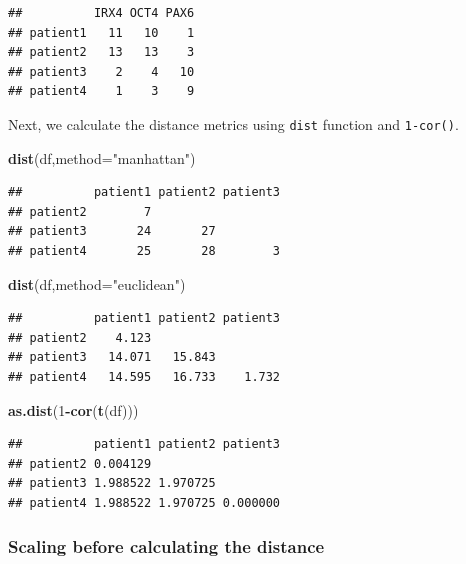 \documentclass[12pt,]{krantz}
\newenvironment{Shaded}{\begin{snugshade}}{\end{snugshade}}
\newcommand{\DataTypeTok}[1]{\textcolor[rgb]{0.13,0.29,0.53}{#1}}
\newcommand{\DecValTok}[1]{\textcolor[rgb]{0.00,0.00,0.81}{#1}}
\newcommand{\KeywordTok}[1]{\textcolor[rgb]{0.13,0.29,0.53}{\textbf{#1}}}
\newcommand{\NormalTok}[1]{#1}
\newcommand{\OperatorTok}[1]{\textcolor[rgb]{0.81,0.36,0.00}{\textbf{#1}}}
\newcommand{\StringTok}[1]{\textcolor[rgb]{0.31,0.60,0.02}{#1}}
\begin{document}
\begin{verbatim}
##          IRX4 OCT4 PAX6
## patient1   11   10    1
## patient2   13   13    3
## patient3    2    4   10
## patient4    1    3    9
\end{verbatim}

Next, we calculate the distance metrics using \texttt{dist} function and \texttt{1-cor()}.

\begin{Shaded}
\begin{Highlighting}[]
\KeywordTok{dist}\NormalTok{(df,}\DataTypeTok{method=}\StringTok{"manhattan"}\NormalTok{)}
\end{Highlighting}
\end{Shaded}

\begin{verbatim}
##          patient1 patient2 patient3
## patient2        7                  
## patient3       24       27         
## patient4       25       28        3
\end{verbatim}

\begin{Shaded}
\begin{Highlighting}[]
\KeywordTok{dist}\NormalTok{(df,}\DataTypeTok{method=}\StringTok{"euclidean"}\NormalTok{)}
\end{Highlighting}
\end{Shaded}

\begin{verbatim}
##          patient1 patient2 patient3
## patient2    4.123                  
## patient3   14.071   15.843         
## patient4   14.595   16.733    1.732
\end{verbatim}

\begin{Shaded}
\begin{Highlighting}[]
\KeywordTok{as.dist}\NormalTok{(}\DecValTok{1}\OperatorTok{-}\KeywordTok{cor}\NormalTok{(}\KeywordTok{t}\NormalTok{(df)))}
\end{Highlighting}
\end{Shaded}

\begin{verbatim}
##          patient1 patient2 patient3
## patient2 0.004129                  
## patient3 1.988522 1.970725         
## patient4 1.988522 1.970725 0.000000
\end{verbatim}

\hypertarget{scaling-before-calculating-the-distance}{%
\subsubsection{Scaling before calculating the distance}\label{scaling-before-calculating-the-distance}}
\end{document}
